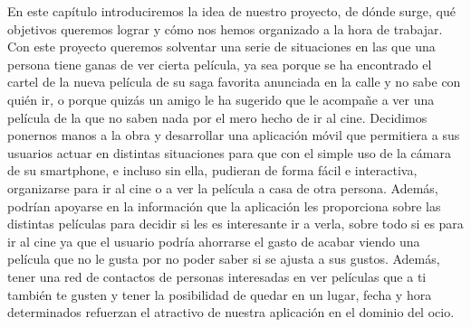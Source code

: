 \begin{flushleft}
    En este capítulo introduciremos la idea de nuestro proyecto, de dónde surge, qué objetivos queremos lograr y cómo nos hemos organizado a la hora de trabajar.
    Con este proyecto queremos solventar una serie de situaciones en las que una persona
    tiene ganas de ver cierta película, ya sea porque se ha encontrado el cartel de la nueva película
    de su saga favorita anunciada en la calle y no sabe con quién ir, o porque quizás un amigo le ha sugerido que le acompañe
    a ver una película de la que no saben nada por el mero hecho de ir al cine. 
    Decidimos ponernos manos a la obra y desarrollar una aplicación móvil que permitiera a sus usuarios actuar en distintas situaciones
    para que con el simple uso de la cámara de su smartphone, e incluso sin ella, pudieran de forma
    fácil e interactiva, organizarse para ir al cine o a ver la película a casa de otra persona. Además, podrían apoyarse en la 
    información que la aplicación les proporciona sobre las distintas películas para decidir si les es interesante ir a verla, sobre todo 
    si es para ir al cine ya que el usuario podría ahorrarse el gasto de acabar viendo una película que no le gusta por no poder saber si se 
    ajusta a sus gustos. Además, tener una red de contactos de personas interesadas en ver películas que a ti también te gusten y tener la posibilidad
    de quedar en un lugar, fecha y hora determinados refuerzan el atractivo de nuestra aplicación en el dominio del ocio.
\end{flushleft}



